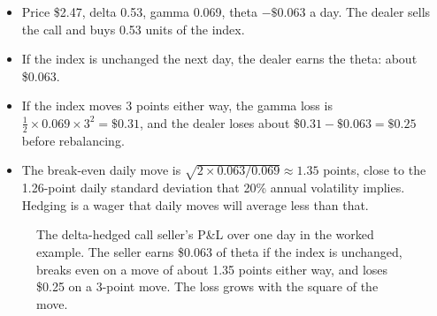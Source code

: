 \begin{itemize}
  \item Price \$2.47, delta 0.53, gamma 0.069, theta $-\$0.063$ a day. The dealer sells the call and buys 0.53 units of the index.
  \item If the index is unchanged the next day, the dealer earns the theta: about \$0.063.
  \item If the index moves 3 points either way, the gamma loss is $\tfrac{1}{2} \times 0.069 \times 3^2 = \$0.31$, and the dealer loses about $\$0.31 - \$0.063 = \$0.25$ before rebalancing.
  \item The break-even daily move is $\sqrt{2 \times 0.063/0.069} \approx 1.35$ points, close to the 1.26-point daily standard deviation that 20\% annual volatility implies. Hedging is a wager that daily moves will average less than that.
\end{itemize}

\begin{figure}[htbp]
\centering
{}
\caption{The delta-hedged call seller's P\&L over one day in the worked example. The seller earns \$0.063 of theta if the index is unchanged, breaks even on a move of about 1.35 points either way, and loses \$0.25 on a 3-point move. The loss grows with the square of the move.}
\label{fig:15-pnl}
\end{figure}

